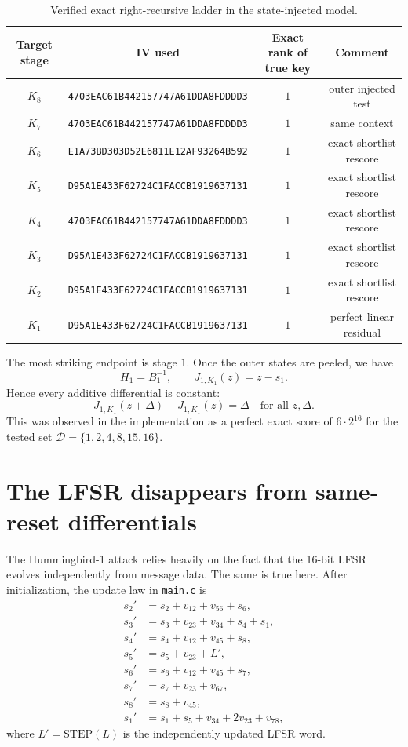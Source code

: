 \documentclass[11pt]{article}
\begin{document}
\begin{table}[h]
\centering
\begin{tabular}{cccc}
\toprule
Target stage & IV used & Exact rank of true key & Comment \\
\midrule
$K_8$ & \texttt{4703EAC61B442157747A61DDA8FDDDD3} & $1$ & outer injected test \\
$K_7$ & \texttt{4703EAC61B442157747A61DDA8FDDDD3} & $1$ & same context \\
$K_6$ & \texttt{E1A73BD303D52E6811E12AF93264B592} & $1$ & exact shortlist rescore \\
$K_5$ & \texttt{D95A1E433F62724C1FACCB1919637131} & $1$ & exact shortlist rescore \\
$K_4$ & \texttt{4703EAC61B442157747A61DDA8FDDDD3} & $1$ & exact shortlist rescore \\
$K_3$ & \texttt{D95A1E433F62724C1FACCB1919637131} & $1$ & exact shortlist rescore \\
$K_2$ & \texttt{D95A1E433F62724C1FACCB1919637131} & $1$ & exact shortlist rescore \\
$K_1$ & \texttt{D95A1E433F62724C1FACCB1919637131} & $1$ & perfect linear residual \\
\bottomrule
\end{tabular}
\caption{Verified exact right-recursive ladder in the state-injected model.}
\end{table}

The most striking endpoint is stage $1$. Once the outer states are peeled, we have
\[
H_1 = B_1^{-1},
\qquad
J_{1,K_1}(z)=z-s_1.
\]
Hence every additive differential is constant:
\[
J_{1,K_1}(z+\Delta)-J_{1,K_1}(z)=\Delta
\quad\text{for all }z,\Delta.
\]
This was observed in the implementation as a perfect exact score of $6\cdot 2^{16}$ for the tested set $\mathcal{D}=\{1,2,4,8,15,16\}$.

\section{The LFSR disappears from same-reset differentials}
The Hummingbird-1 attack relies heavily on the fact that the 16-bit LFSR evolves independently from message data. The same is true here. After initialization, the update law in \texttt{main.c} is
\begin{align*}
s_2' &= s_2 + v_{12} + v_{56} + s_6,\\
s_3' &= s_3 + v_{23} + v_{34} + s_4 + s_1,\\
s_4' &= s_4 + v_{12} + v_{45} + s_8,\\
s_5' &= s_5 + v_{23} + L',\\
s_6' &= s_6 + v_{12} + v_{45} + s_7,\\
s_7' &= s_7 + v_{23} + v_{67},\\
s_8' &= s_8 + v_{45},\\
s_1' &= s_1 + s_5 + v_{34} + 2v_{23} + v_{78},
\end{align*}
where $L'=\mathrm{STEP}(L)$ is the independently updated LFSR word.
\end{document}
